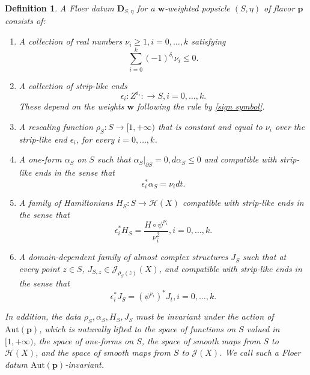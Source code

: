 \documentclass[11pt]{amsproc}
\def\e{\epsilon}
\def\e{\epsilon}
\def\r#1{\mathrm{#1}}
\def\d{\delta}
\def\p{\partial}
\def\sk{\mathfrak{s}}
\newtheorem{defn}[lem]{Definition}
\def\e{\epsilon}
\theoremstyle{remark}
\numberwithin{equation}{section}
\begin{document}
\begin{defn}\label{def: Floer data}
A Floer datum $\mathbf{D}_{S, \eta}$ for a $\mathbf{w}$-weighted popsicle $(S, \eta)$ of flavor $\mathbf{p}$ consists of:
\begin{enumerate}[label=(\roman*)]

\item A collection of real numbers $\nu_{i} \ge 1, i=0, \ldots, k$ satisfying
\begin{equation}
\sum_{i=0}^{k} (-1)^{\d_{i}} \nu_{i} \le 0.
\end{equation}

\item A collection of strip-like ends 
\begin{equation} 
\e_{i}: Z^{\sk_{i}}: \to S, i=0, \ldots, k.
\end{equation}
These depend on the weights $\mathbf{w}$ following the rule by \eqref{sign symbol}.

\item A rescaling function $\rho_{S}: S \to [1, +\infty)$ that is constant and equal to $\nu_{i}$ over the strip-like end $\e_{i}$, for every $i=0, \ldots, k$.

\item A one-form $\alpha_{S}$ on $S$ such that $\alpha_{S}|_{\p S} = 0, d \alpha_{S} \le 0$ and compatible with strip-like ends in the sense that
\begin{equation}
\e_{i}^{*} \alpha_{S} = \nu_{i} dt.
\end{equation}

\item A family of Hamiltonians $H_{S}: S \to \mathcal{H}(X)$ compatible with strip-like ends in the sense that
\begin{equation}
\e_{i}^{*}H_{S} = \frac{H \circ \psi^{\nu_{i}}}{\nu_{i}^{2}}, i = 0, \ldots, k.
\end{equation}

\item A domain-dependent family of almost complex structures $J_{S}$ such that at every point $z \in S$, $J_{S, z} \in \mathcal{J}_{\rho_{S}(z)}(X)$, and compatible with strip-like ends in the sense that
\begin{equation}
\e_{i}^{*}J_{S} = (\psi^{\nu_{i}})^{*} J_{t}, i = 0, \ldots, k.
\end{equation}

\end{enumerate}
In addition, the data $\rho_{S}, \alpha_{S}, H_{S}, J_{S}$ must be invariant under the action of $\r{Aut}(\mathbf{p})$,
which is naturally lifted to the space of functions on $S$ valued in $[1, +\infty)$, the space of one-forms on $S$,
the space of smooth maps from $S$ to $\mathcal{H}(X)$, 
and the space of smooth maps from $S$ to $\mathcal{J}(X)$.
We call such a Floer datum $\r{Aut}(\mathbf{p})$-invariant.
\end{defn}
\end{document}
